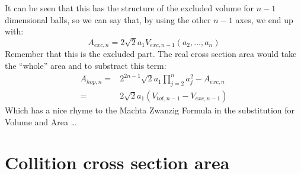 \documentclass[superscriptaddress,pre,reprint,showpacs,onecolumn]{revtex4-1}
\begin{document}
It can be seen that this has the structure of the excluded volume
for $n-1$ dimensional balls, so we can say that, by using the other
$n-1$ axes, we end up with:
\begin{equation}
  A_{exc,n}=2 \sqrt{2}a_1V_{exc,n-1}(a_2,\ldots,a_n)
\end{equation}
Remember that this is the excluded part. The real cross
section area would take
the ``whole'' area and to substract this term:
\begin{equation}
  \begin{split}
    A_{hop,n}  = & 2^{2n-1}\sqrt{2}a_1\prod_{j=2}^n a_j^2-A_{exc,n} \\
      = & 2 \sqrt{2}a_1 (V_{tot,n-1} - V_{exc,n-1})
  \end{split} 
\end{equation}
Which has a nice rhyme to the Machta Zwanzig Formula in the substitution
for Volume and Area \ldots

\section{Collition cross section area}
\end{document}
